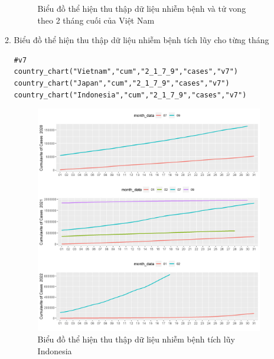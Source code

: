 \documentclass[a4paper]{article}
\theoremstyle{definition}
\begin{document}
\begin{enumerate}[i)]
\begin{enumerate}[1)]
\begin{figure}[htp]
		    \caption{Biểu đồ thể hiện thu thập dữ liệu nhiễm bệnh và tử vong theo 2 tháng cuối của Việt Nam}
		    \label{fig:my_label}
		\end{figure}
    \newpage
    \item Biểu đồ thể hiện thu thập dữ liệu nhiễm bệnh tích lũy cho từng tháng
    \begin{lstlisting}[frame=single]  
#v7
country_chart("Vietnam","cum","2_1_7_9","cases","v7")
country_chart("Japan","cum","2_1_7_9","cases","v7")
country_chart("Indonesia","cum","2_1_7_9","cases","v7")
		\end{lstlisting}
		\begin{figure}[htp]
		    \centering
		    \includegraphics[scale = 0.7]{Images/V/v7 Indonesia .jpeg}
		    \caption{Biểu đồ thể hiện thu thập dữ liệu nhiễm bệnh tích lũy Indonesia}
		    \label{fig:my_label}
		\end{figure}
		\begin{figure}[htp]
		    \centering

\end{figure}
\end{enumerate}
\end{enumerate}
\end{document}
